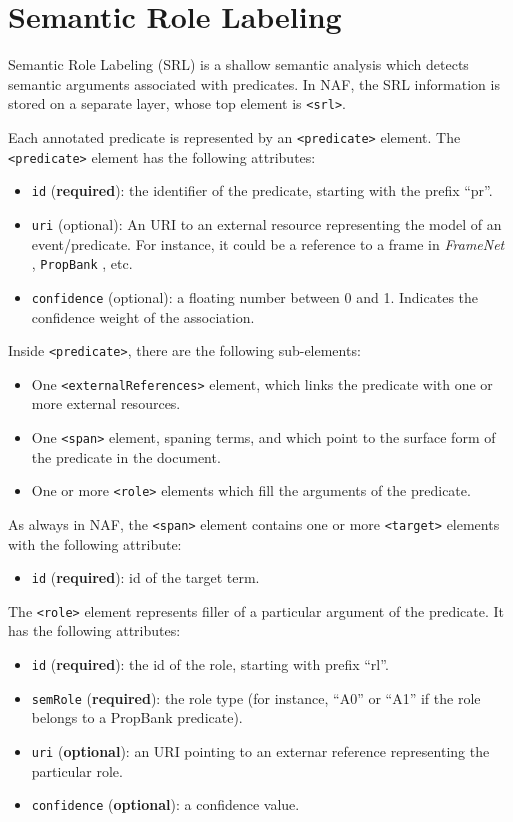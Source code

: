 
\section{Semantic Role Labeling}
\label{sec:semant-role-label}

Semantic Role Labeling (SRL) is a shallow semantic analysis which detects
semantic arguments associated with predicates. In NAF, the SRL information
is stored on a separate layer, whose top element is \texttt{<srl>}.

Each annotated predicate is represented by an \texttt{<predicate>}
element. The \texttt{<predicate>} element has the following attributes:
\begin{itemize}
\item \texttt{id} (\textbf{required}): the identifier of the predicate,
  starting with the prefix ``pr''.
\item \texttt{uri} (optional): An URI to an external resource representing the model of
  an event/predicate. For instance, it could be a reference to a frame in
  \emph{FrameNet} \cite{Baker+'98}, \texttt{PropBank} \cite{propbank02}, etc.
\item \texttt{confidence} (optional): a floating number between 0 and
  1. Indicates the confidence weight of the association.
\end{itemize}


Inside \texttt{<predicate>}, there are the following sub-elements:
\begin{itemize}
\item One \texttt{<externalReferences>} element, which links the predicate
  with one or more external resources.
\item One \texttt{<span>} element, spaning terms, and which point to the
  surface form of the predicate in the document.
\item One or more \texttt{<role>} elements which fill the arguments of the
  predicate.
\end{itemize}

As always in NAF, the \texttt{<span>} element contains one or more
\texttt{<target>} elements with the following attribute:

\begin{itemize}
\item \texttt{id} (\textbf{required}): id of the target term.
\end{itemize}

The \texttt{<role>} element represents filler of a particular argument of
the predicate. It has the following attributes:
\begin{itemize}
\item \texttt{id} (\textbf{required}): the id of the role, starting with
  prefix ``rl''.
\item \texttt{semRole} (\textbf{required}): the role type (for instance,
  ``A0'' or ``A1'' if the role belongs to a PropBank predicate).
\item \texttt{uri} (\textbf{optional}): an URI pointing to an externar
  reference representing the particular role.
\item \texttt{confidence} (\textbf{optional}): a confidence value.
\end{itemize}

